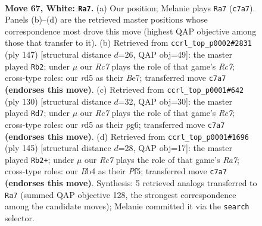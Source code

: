 \documentclass[11pt]{article}
\begin{document}
\clearpage

\begin{figure}[p]\centering
\begin{subfigure}{0.46\textwidth}\centering
\resizebox{\linewidth}{!}{%
\newchessgame
\chessboard[
  setfen={8/2R2pk1/5n2/3r4/pB3P1p/P3K2P/8/8 w - - 9 67},
  showmover=false,
  pgfstyle=straightmove, color=movearrow, markmove={c7-a7}
]}
\caption{}
\end{subfigure}\hfill
\begin{subfigure}{0.46\textwidth}\centering
\resizebox{\linewidth}{!}{%
\newchessgame
\chessboard[
  setfen={7R/4b3/8/5k2/4p2p/4P3/2r2PKN/8 b - - 5 74},
  showmover=false,
  pgfstyle=straightmove, color=movearrow, markmove={c2-b2}
]}
\caption{}
\end{subfigure}
\\[4pt]
\begin{subfigure}{0.46\textwidth}\centering
\resizebox{\linewidth}{!}{%
\newchessgame
\chessboard[
  setfen={7k/4R2p/3n2p1/8/3r2PP/5P1K/4B3/8 w - - 1 66},
  showmover=false,
  pgfstyle=straightmove, color=movearrow, markmove={e7-d7}
]}
\caption{}
\end{subfigure}\hfill
\begin{subfigure}{0.46\textwidth}\centering
\resizebox{\linewidth}{!}{%
\newchessgame
\chessboard[
  setfen={8/5k2/PK3p2/5ppp/2P5/6P1/r7/4R3 b - - 8 73},
  showmover=false,
  pgfstyle=straightmove, color=movearrow, markmove={a2-b2}
]}
\caption{}
\end{subfigure}
\caption{\textbf{Move 67, White: \texttt{Ra7}.} (a) Our position; Melanie plays \texttt{Ra7} (\texttt{c7a7}). Panels (b)--(d) are the retrieved master positions whose correspondence most drove this move (highest QAP objective among those that transfer to it). (b) Retrieved from \texttt{ccrl\_top\_p0002\#2831} (ply 147) [structural distance $d$=26, QAP obj=49]: the master played \texttt{Rb2}; under $\mu$ our \emph{Rc7} plays the role of that game's \emph{Rc7}; cross-type roles: our \emph{r}d5 as their \emph{B}e7; transferred move \texttt{c7a7} \textbf{(endorses this move)}. (c) Retrieved from \texttt{ccrl\_top\_p0001\#642} (ply 130) [structural distance $d$=32, QAP obj=30]: the master played \texttt{Rd7}; under $\mu$ our \emph{Rc7} plays the role of that game's \emph{Re7}; cross-type roles: our \emph{r}d5 as their \emph{p}g6; transferred move \texttt{c7a7} \textbf{(endorses this move)}. (d) Retrieved from \texttt{ccrl\_top\_p0001\#1696} (ply 145) [structural distance $d$=28, QAP obj=17]: the master played \texttt{Rb2+}; under $\mu$ our \emph{Rc7} plays the role of that game's \emph{Ra7}; cross-type roles: our \emph{B}b4 as their \emph{P}f5; transferred move \texttt{c7a7} \textbf{(endorses this move)}. Synthesis: 5 retrieved analogs transferred to \texttt{Ra7} (summed QAP objective 128, the strongest correspondence among the candidate moves); Melanie committed it via the \texttt{search} selector.}
\label{fig:thought-m132}
\end{figure}
\end{document}
